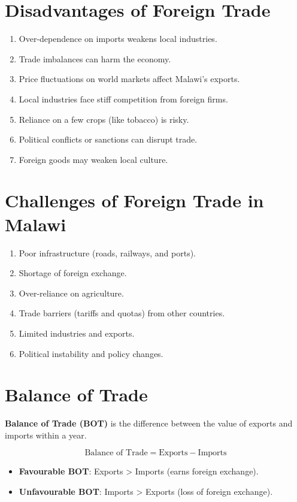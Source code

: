 \documentclass[12pt,a4paper, openany]{book}
\begin{document}
\section{Disadvantages of Foreign Trade}
\begin{enumerate}
	\item Over-dependence on imports weakens local industries.
	\item Trade imbalances can harm the economy.
	\item Price fluctuations on world markets affect Malawi’s exports.
	\item Local industries face stiff competition from foreign firms.
	\item Reliance on a few crops (like tobacco) is risky.
	\item Political conflicts or sanctions can disrupt trade.
	\item Foreign goods may weaken local culture.
\end{enumerate}

\section{Challenges of Foreign Trade in Malawi}
\begin{enumerate}
	\item Poor infrastructure (roads, railways, and ports).
	\item Shortage of foreign exchange.
	\item Over-reliance on agriculture.
	\item Trade barriers (tariffs and quotas) from other countries.
	\item Limited industries and exports.
	\item Political instability and policy changes.
\end{enumerate}

\section{Balance of Trade}
\textbf{Balance of Trade (BOT)} is the difference between the value of exports and imports within a year.

\[
	\text{Balance of Trade} = \text{Exports} - \text{Imports}
\]

\begin{itemize}
	\item \textbf{Favourable BOT}: Exports > Imports (earns foreign exchange).
	\item \textbf{Unfavourable BOT}: Imports > Exports (loss of foreign exchange).
\end{itemize}
\end{document}
